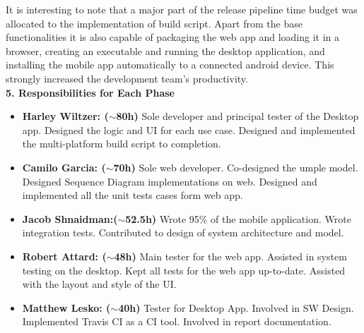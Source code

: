 \documentclass[12pt]{article}
\begin{document}
It is interesting to note that a major part of the release pipeline time budget was allocated to the
implementation of build script. Apart from the base functionalities it is also capable of packaging
the web app and loading it in a browser, creating an executable and running the desktop application,
and installing the mobile app automatically to a connected android device. This strongly increased
the development team's productivity.\\

\textbf{5. Responsibilities for Each Phase}
\begin{itemize}
    \item \textbf{Harley Wiltzer: ($\sim$80h)} Sole developer and principal tester of the Desktop app. Designed the logic and UI for each use case. Designed and implemented the multi-platform build script to completion.
    \item \textbf{Camilo Garcia: ($\sim$70h)} Sole web developer. Co-designed the umple model. Designed Sequence Diagram implementations on web. Designed and implemented all the unit tests cases form web app. 
    \item \textbf{Jacob Shnaidman:($\sim$52.5h)} Wrote 95\% of the mobile application. Wrote integration tests. Contributed to design of system architecture and model. 
    \item \textbf{Robert Attard: ($\sim$48h)}
    Main tester for the web app. Assisted in system testing on the desktop. Kept all tests for the web app up-to-date. Assisted with the layout and style of the UI.
    \item \textbf{Matthew Lesko: ($\sim$40h)} Tester for Desktop App. Involved in SW Design. Implemented Travis CI as a CI tool. Involved in report documentation.
\end{itemize}
\end{document}
